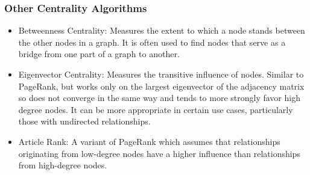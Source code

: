\begin{frame}[fragile]\frametitle{Other Centrality Algorithms}

 
\begin{itemize}
\item Betweenness Centrality: Measures the extent to which a node stands between the other nodes in a graph. It is often used to find nodes that serve as a bridge from one part of a graph to another.
\item Eigenvector Centrality: Measures the transitive influence of nodes. Similar to PageRank, but works only on the largest eigenvector of the adjacency matrix so does not converge in the same way and tends to more strongly favor high degree nodes. It can be more appropriate in certain use cases, particularly those with undirected relationships.
\item Article Rank: A variant of PageRank which assumes that relationships originating from low-degree nodes have a higher influence than relationships from high-degree nodes.
\end{itemize}


\end{frame}



